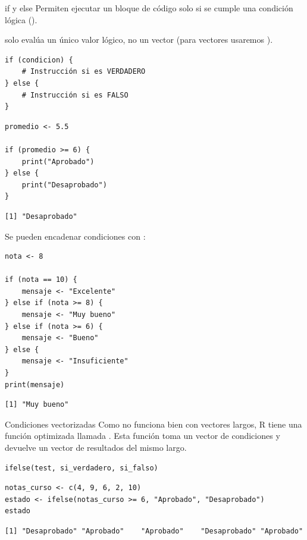 \documentclass[8pt]{beamer}
\begin{document}
\begin{frame}[fragile]{if y else}
	Permiten ejecutar un bloque de código solo si se cumple una condición lógica (). 
	\begin{alertblock}{}
		 solo evalúa un único valor lógico, no un vector (para vectores usaremos ).
	\end{alertblock}
\begin{lstlisting}[style=RScript]
if (condicion) {
	# Instrucción si es VERDADERO
} else {
	# Instrucción si es FALSO
}	
\end{lstlisting}
	
\begin{lstlisting}[style=RScript]
promedio <- 5.5

if (promedio >= 6) {
	print("Aprobado")
} else {
	print("Desaprobado")
}	
\end{lstlisting}
\begin{lstlisting}[style=RConsole]
[1] "Desaprobado"	
\end{lstlisting}
\end{frame}



\begin{frame}[fragile]
Se pueden encadenar condiciones con :
\begin{lstlisting}[style=RScript]
nota <- 8

if (nota == 10) {
	mensaje <- "Excelente"
} else if (nota >= 8) {
	mensaje <- "Muy bueno"
} else if (nota >= 6) {
	mensaje <- "Bueno"
} else {
	mensaje <- "Insuficiente"
}
print(mensaje)
\end{lstlisting}
\begin{lstlisting}[style=RConsole]
[1] "Muy bueno"
\end{lstlisting}
\end{frame}



\begin{frame}[fragile]{Condiciones vectorizadas}
Como  no funciona bien con vectores largos, R tiene una función optimizada llamada . Esta función toma un vector de condiciones y devuelve un vector de resultados del mismo largo.

\begin{lstlisting}[style=RScript]
ifelse(test, si_verdadero, si_falso)
\end{lstlisting}

\begin{lstlisting}[style=RScript]
notas_curso <- c(4, 9, 6, 2, 10)
estado <- ifelse(notas_curso >= 6, "Aprobado", "Desaprobado")
estado
\end{lstlisting}
\begin{lstlisting}[style=RConsole]
[1] "Desaprobado" "Aprobado"    "Aprobado"    "Desaprobado" "Aprobado"   
\end{lstlisting}
\end{frame}
\end{document}
